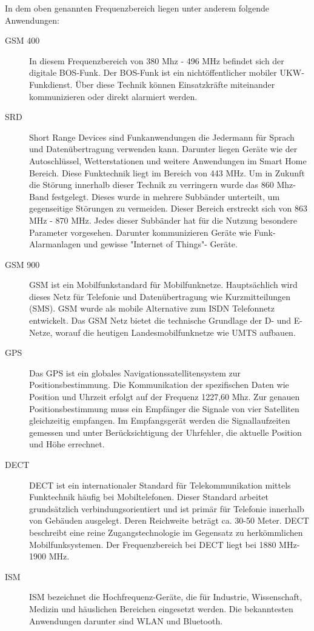 In dem oben genannten Frequenzbereich liegen unter anderem folgende Anwendungen:

\begin{description}

	\item [\ac{GSM} 400]{In diesem Frequenzbereich von 380 Mhz - 496 MHz befindet sich der digitale \ac{BOS}-Funk. Der BOS-Funk ist ein nichtöffentlicher mobiler \ac{UKW}-Funkdienst. Über diese Technik können Einsatzkräfte miteinander kommunizieren oder direkt alarmiert werden.}
	\item [\ac{SRD}] {Short Range Devices sind Funkanwendungen die Jedermann für Sprach und Datenübertragung verwenden kann. Darunter liegen Geräte wie der Autoschlüssel, Wetterstationen und weitere Anwendungen im Smart Home Bereich. Diese Funktechnik liegt im Bereich von 443 MHz. Um in Zukunft die Störung innerhalb dieser Technik zu verringern  wurde das 860 Mhz-Band festgelegt. Dieses wurde in mehrere Subbänder unterteilt, um gegenseitige Störungen zu vermeiden. Dieser Bereich erstreckt sich von 863 MHz - 870 MHz. Jedes dieser Subbänder hat für die Nutzung besondere Parameter vorgesehen. Darunter kommunizieren Geräte wie Funk-Alarmanlagen und gewisse "Internet of Things"- Geräte.}
	\item [\ac{GSM} 900] {GSM ist ein Mobilfunkstandard für Mobilfunknetze. Hauptsächlich wird dieses Netz für Telefonie und Datenübertragung wie Kurzmitteilungen (SMS). GSM wurde als mobile Alternative zum ISDN Telefonnetz entwickelt. Das GSM Netz bietet die technische Grundlage der D- und E-Netze, worauf die heutigen Landesmobilfunknetze wie UMTS aufbauen.}
	\item [\ac{GPS}] {Das GPS ist ein globales Navigationssatellitensystem zur Positionsbestimmung. Die Kommunikation der spezifischen Daten wie Position und Uhrzeit erfolgt auf der Frequenz 1227,60 Mhz. Zur genauen Positionsbestimmung muss ein Empfänger die Signale von vier Satelliten gleichzeitig empfangen. Im Empfangsgerät werden die Signallaufzeiten gemessen und unter Berücksichtigung der Uhrfehler, die aktuelle Position und Höhe errechnet.}
	\item [\ac{DECT}] {DECT ist ein internationaler Standard für Telekommunikation mittels Funktechnik häufig bei Mobiltelefonen. Dieser Standard arbeitet grundsätzlich verbindungsorientiert und ist primär für Telefonie innerhalb von Gebäuden ausgelegt. Deren Reichweite beträgt ca. 30-50 Meter. DECT beschreibt eine reine Zugangstechnologie im Gegensatz zu herkömmlichen Mobilfunksystemen. Der Frequenzbereich bei DECT liegt bei 1880 MHz-1900 MHz.}
	\item [\ac{ISM}] {ISM bezeichnet die Hochfrequenz-Geräte, die für Industrie, Wissenschaft, Medizin und häuslichen Bereichen eingesetzt werden. Die bekanntesten Anwendungen darunter sind  WLAN und Bluetooth.}
\end{description}


